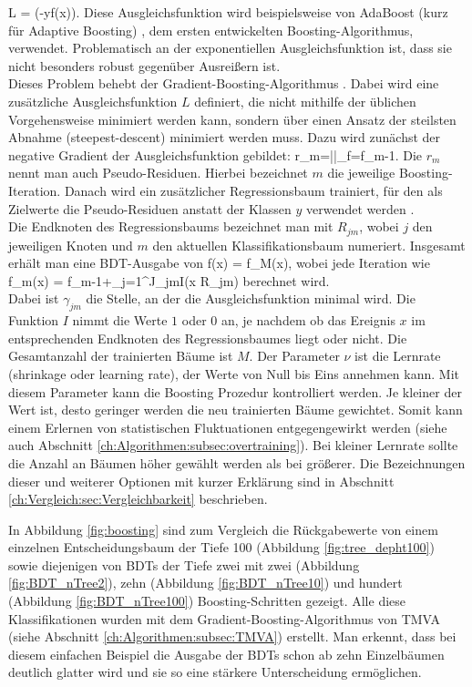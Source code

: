 \beq
L = \exp(-y\cdot f(x)).
\label{eq:exp_loss}
\eeq
Diese Ausgleichsfunktion wird beispielsweise von AdaBoost (kurz f\"ur Adaptive Boosting) \cite{ADABoost}, dem ersten entwickelten Boosting-Algorithmus, verwendet. Problematisch an der exponentiellen Ausgleichsfunktion ist, dass sie nicht besonders robust gegen\"uber Ausrei\ss ern ist.\\
Dieses Problem behebt der Gradient-Boosting-Algorithmus \cite{Friedman00greedyfunction}. Dabei wird eine zus\"atzliche Ausgleichsfunktion $L$ definiert, die nicht mithilfe der \"ublichen Vorgehensweise minimiert werden kann, sondern \"uber einen Ansatz der steilsten Abnahme (steepest-descent) minimiert werden muss. Dazu wird zun\"achst der negative Gradient der Ausgleichsfunktion gebildet:
\beq
r_m=\left|\right|_{f=f_{m-1}}.
\label{eq:pseudo_residual}
\eeq
Die $r_m$ nennt man auch Pseudo-Residuen. Hierbei bezeichnet $m$ die jeweilige Boosting-Iteration. Danach wird ein zus\"atzlicher Regressionsbaum trainiert, f\"ur den als Zielwerte die Pseudo-Residuen anstatt der Klassen $y$ verwendet werden \cite{Hocker:2007ht}.\\
Die Endknoten des Regressionsbaums bezeichnet man mit $R_{jm}$, wobei $j$ den jeweiligen Knoten und $m$ den aktuellen Klassifikationsbaum numeriert. Insgesamt erh\"alt man eine BDT-Ausgabe von
\beq
\hat f(x) = f_M(x),
\eeq
wobei jede Iteration wie
\beq
f_m(x) = f_{m-1}+\nu\cdot\sum_{j=1}^J\gamma_{jm}I(x \in R_{jm})
\eeq
berechnet wird.\\
Dabei ist $\gamma_{jm}$ die Stelle, an der die Ausgleichsfunktion minimal wird. Die Funktion $I$ nimmt die Werte $1$ oder $0$ an, je nachdem ob das Ereignis $x$ im entsprechenden Endknoten des Regressionsbaumes liegt oder nicht. Die Gesamtanzahl der trainierten B\"aume ist $M$.
Der Parameter $\nu$ ist die Lernrate (shrinkage oder learning rate), der Werte von Null bis Eins annehmen kann. Mit diesem Parameter kann die Boosting Prozedur kontrolliert werden. Je kleiner der Wert ist, desto geringer werden die neu trainierten B\"aume gewichtet. Somit kann einem Erlernen von statistischen Fluktuationen entgegengewirkt werden (siehe auch Abschnitt \ref{ch:Algorithmen:subsec:overtraining}). Bei kleiner Lernrate sollte die Anzahl an B\"aumen h\"oher gew\"ahlt werden als bei gr\"o\ss erer. Die Bezeichnungen dieser und weiterer Optionen mit kurzer Erkl\"arung sind in Abschnitt \ref{ch:Vergleich:sec:Vergleichbarkeit} beschrieben.

In Abbildung \ref{fig:boosting} sind zum Vergleich die R\"uckgabewerte von einem einzelnen Entscheidungsbaum der Tiefe 100 (Abbildung \ref{fig:tree_depht100}) sowie diejenigen von BDTs der Tiefe zwei mit zwei (Abbildung \ref{fig:BDT_nTree2}), zehn (Abbildung \ref{fig:BDT_nTree10}) und hundert (Abbildung \ref{fig:BDT_nTree100}) Boosting-Schritten gezeigt. Alle diese Klassifikationen wurden mit dem Gradient-Boosting-Algorithmus von TMVA (siehe Abschnitt \ref{ch:Algorithmen:subsec:TMVA}) erstellt. Man erkennt, dass bei diesem einfachen Beispiel die Ausgabe der BDTs schon ab zehn Einzelb\"aumen deutlich glatter wird und sie so eine st\"arkere Unterscheidung erm\"oglichen.

